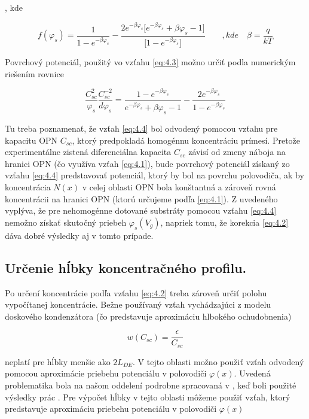 , kde

\begin{equation}\label{eq:4.3}
f(\varphi_{s}) = \frac{1}{1-e^{-\beta\varphi_{s}}} - \frac{2e^{-\beta\varphi_{s}}\bigg[e^{-\beta\varphi_{s}}+\beta\varphi_{s} -1\bigg]}{\bigg[1 - e^{-\beta\varphi_{s}}\bigg]} \qquad,kde\quad \beta=\frac{q}{kT}
\end{equation}

Povrchový potenciál, použitý vo vzťahu \ref{eq:4.3} možno určiť podla
\cite{4.7} numerickým riešením rovnice

\begin{equation}\label{eq:4.4}
\frac{C_{sc}^{2}}{\varphi_{s}}\frac{C_{sc}^{-2}}{d\varphi_{s}} = \frac{1-e^{-\beta\varphi_{s}}}{e^{-\beta\varphi_{s}}+\beta\varphi_{s}-1} - \frac{2e^{-\beta\varphi_{s}}} {1-e^{-\beta\varphi_{s}}}
\end{equation}

Tu treba poznamenať, že vzťah \ref{eq:4.4} bol odvodený pomocou vzťahu
pre kapacitu OPN $C_{sc}$, ktorý predpokladá homogénnu koncentráciu
prímesí. Pretože experimentálne zistená diferenciálna kapacita
$C_{sc}$ závisí od zmeny náboja na hranici OPN (čo využíva vzťah
\ref{eq:4.1}), bude povrchový potenciál získaný zo vzťahu \ref{eq:4.4}
predstavovať potenciál, ktorý by bol na povrchu polovodiča, ak by
koncentrácia $N(x)$ v celej oblasti OPN bola konštantná a zároveň
rovná koncentrácii na hranici OPN (ktorú určujeme podľa
\ref{eq:4.1}). Z uvedeného vyplýva, že pre nehomogénne dotované
substráty pomocou vzťahu \ref{eq:4.4} nemožno získať skutočný priebeh
$\varphi_{s}(V_{g})$, napriek tomu, že korekcia \ref{eq:4.2} dáva
dobré výsledky aj v tomto prípade.

\subsection[Určenie hĺbky koncentračného profilu.]{Určenie hĺbky koncentračného profilu.}\label{sec:4.1.2}

Po určení koncentrácie podľa vzťahu \ref{eq:4.2} treba zároveň určiť
polohu vypočítanej koncentrácie. Bežne používaný vzťah vychádzajúci z
modelu doskového kondenzátora (čo predstavuje aproximáciu hlbokého
ochudobnenia)

\begin{equation}\label{eq:4.5}
w(C_{sc}) = \frac{\epsilon}{C_{sc}}
\end{equation}

neplatí pre hĺbky menšie ako $2L_{DE}$. V tejto oblasti možno použiť vzťah
odvodený pomocou aproximácie priebehu potenciálu v polovodiči
$\varphi(x)$. Uvedená problematika bola na našom oddelení podrobne
spracovaná v \cite{4.13, 4.14}, keď boli použité výsledky prác
\cite{4.9, 4.10, 4.11}. Pre výpočet hĺbky v tejto oblasti môžeme
použiť vzťah, ktorý predstavuje aproximáciu priebehu potenciálu v
polovodiči $\varphi(x)$ \cite{I.1}

